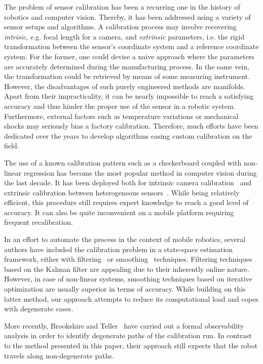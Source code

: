 The problem of sensor calibration has been a recurring one in the history of
robotics and computer vision. Thereby, it has been addressed using a
variety of sensor setups and algorithms. A calibration process may involve
recovering \emph{intrisic}, e.g. focal length for a camera, and \emph{extrinsic}
parameters, i.e. the rigid transformation between the sensor's coordinate system
and a reference coordinate system. For the former, one could devise a naive
approach where the parameters are accurately determined during the manufacturing
process. In the same vein, the transformation could be retrieved by means of
some measuring instrument. However, the disadvantages of such purely
engineered methods are manifolds. Apart from their impracticality, it can be
nearly impossible to reach a satisfying accuracy and thus hinder the proper use
of the sensor in a robotic system. Furthermore, external factors such as
temperature variations or mechanical shocks may seriously bias a factory
calibration. Therefore, much efforts have been dedicated over the years to
develop algorithms easing custom calibration on the field.

The use of a known calibration pattern such as a checkerboard coupled with
non-linear regression has become the most popular method in computer vision
during the last decade. It has been deployed both for intrinsic camera
calibration~\cite{sturm99plane} and extrinsic calibration
between heterogeneous sensors~\cite{zhang04extrinsic}. While being relatively
efficient, this procedure still requires expert knowledge to reach a good level
of accuracy. It can also be quite inconvenient on a mobile platform requiring
frequent recalibration.

In an effort to automate the process in the context of mobile robotics, several
authors have included the calibration problem in a state-space estimation
framework, either with filtering~\cite{martinelli06automatic} or
smoothing~\cite{kuemmerle11simultaneous} techniques. Filtering techniques based
on the Kalman filter are appealing due to their inherently online nature.
However, in case of non-linear systems, smoothing techniques based on iterative
optimization are usually superior in terms of accuracy. While building on this
latter method, our approach attempts to reduce its computational load and copes
with degenerate cases.

More recently, Brookshire and Teller~\cite{brookshire12extrinsic} have carried
out a formal observability analysis in order to identify degenerate paths of
the calibration run. In contrast to the method presented in this paper, their
approach still expects that the robot travels along non-degenerate paths.

